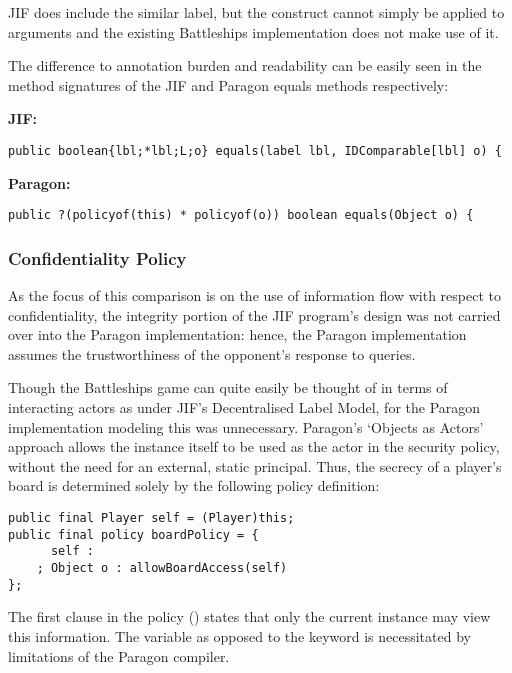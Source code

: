 JIF does include the similar  label, but the construct cannot simply be applied to arguments and the existing Battleships implementation does not make use of it.

The difference to annotation burden and readability can be easily seen in the method signatures of the JIF and Paragon equals methods respectively:

\textbf{JIF:}

\begin{verbatim}
public boolean{lbl;*lbl;L;o} equals(label lbl, IDComparable[lbl] o) {
\end{verbatim}

\textbf{Paragon:}

\begin{verbatim}
public ?(policyof(this) * policyof(o)) boolean equals(Object o) {
\end{verbatim}

\subsubsection{Confidentiality Policy}

As the focus of this comparison is on the use of information flow with respect to confidentiality, the integrity portion of the JIF program's design was not carried over into the Paragon implementation: hence, the Paragon implementation assumes the trustworthiness of the opponent's response to queries.

Though the Battleships game can quite easily be thought of in terms of interacting actors as under JIF's Decentralised Label Model, for the Paragon implementation modeling this was unnecessary. Paragon's `Objects as Actors' approach allows the  instance itself to be used as the actor in the security policy, without the need for an external, static principal. Thus, the secrecy of a player's board is determined solely by the following policy definition:

\begin{verbatim}
public final Player self = (Player)this;
public final policy boardPolicy = {
	  self :
	; Object o : allowBoardAccess(self)
};
\end{verbatim}

The first clause in the policy () states that only the current instance may view this information. The  variable as opposed to the  keyword is necessitated by limitations of the Paragon compiler.

